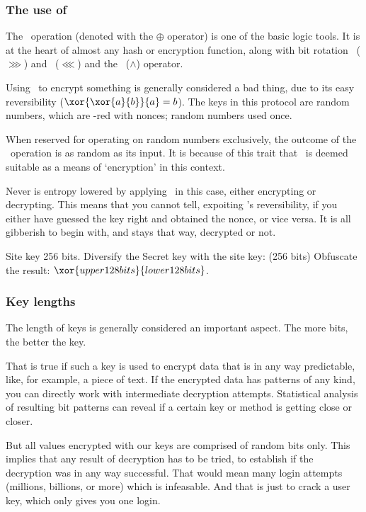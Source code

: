 \subsubsection{The use of \XOR}
The \XOR\ operation
(denoted with the $\oplus$ operator)
is one of the basic logic tools.
It is at the heart of almost any hash or encryption function,
along with bit rotation \ROTR\ ($\ggg$) and \ROTL\ ($\lll$) and the \AND\ ($\wedge$) operator.
\par
Using \XOR\ to encrypt something is generally considered a bad thing,
due to its easy reversibility ($\xor{\xor{a}{b}}{a} = b$).
The keys in this protocol are random numbers, which are \XOR-red with nonces; random numbers used once.
\begin{axiom}
When reserved for operating on random numbers exclusively,
the outcome of the \XOR\ operation is as random as its input.
It is because of this trait that \XOR\ is deemed suitable as a means of `encryption' in this context.
\end{axiom}
Never is entropy lowered by applying \XOR\ in this case, either encrypting or decrypting.
This means that you cannot tell, expoiting \XOR's reversibility, if you either have guessed the key right and obtained the nonce, or vice versa.
It is all gibberish to begin with, and stays that way, decrypted or not.


\par
Site key 256 bits.
Diversify the Secret key with the site key:  (256 bits)
Obfuscate the result: $\xor{upper 128 bits}{lower 128 bits}$.

\subsubsection{Key lengths}
\label{sec:key_length}
The length of keys is generally considered an important aspect.
The more bits, the better the key.
\par
That is true if such a key is used to encrypt data that is in any way predictable,
like, for example, a piece of text.
If the encrypted data has patterns of any kind,
you can directly work with intermediate decryption attempts.
Statistical analysis of resulting bit patterns can reveal if a certain key or method is getting close or closer.
\par
But all values encrypted with our keys are comprised of random bits only.
This implies that any result of decryption has to be tried,
to establish if the decryption was in any way successful.
That would mean many login attempts
(millions, billions, or more)
which is infeasable.
And that is just to crack a user key,
which only gives you one login.

